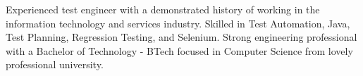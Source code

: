 Experienced test engineer with a demonstrated history of working in the information
technology and services industry. Skilled in Test Automation, Java, Test Planning,
Regression Testing, and Selenium. Strong engineering professional with a Bachelor
of Technology - BTech focused in Computer Science from lovely professional university.


